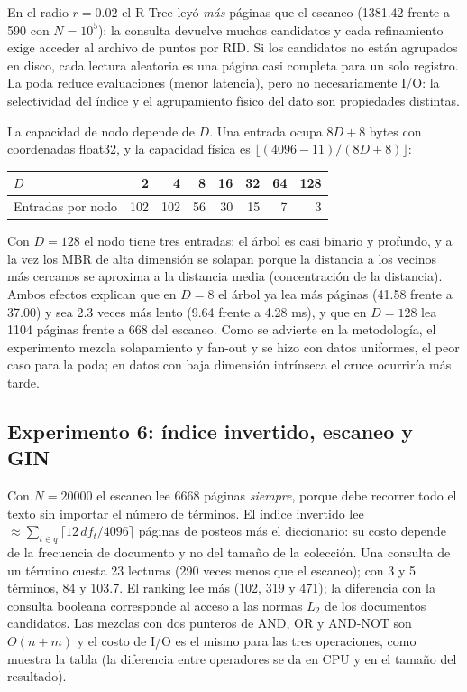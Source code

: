 \documentclass[11pt,a4paper]{article}
\begin{document}
En el radio $r=0.02$ el R-Tree leyó \emph{más} páginas que el escaneo (1381.42 frente a 590 con $N=10^5$): la consulta devuelve muchos candidatos y cada refinamiento exige acceder al archivo de puntos por RID. Si los candidatos no están agrupados en disco, cada lectura aleatoria es una página casi completa para un solo registro. La poda reduce evaluaciones (menor latencia), pero no necesariamente I/O: la selectividad del índice y el agrupamiento físico del dato son propiedades distintas.

La capacidad de nodo depende de $D$. Una entrada ocupa $8D+8$ bytes con coordenadas float32, y la capacidad física es $\lfloor(4096-11)/(8D+8)\rfloor$:
\begin{center}\small\begin{tabular}{@{}lrrrrrrr@{}}\toprule
$D$ & 2 & 4 & 8 & 16 & 32 & 64 & 128\\\midrule
Entradas por nodo & 102 & 102 & 56 & 30 & 15 & 7 & 3\\\bottomrule\end{tabular}\end{center}
Con $D=128$ el nodo tiene tres entradas: el árbol es casi binario y profundo, y a la vez los MBR de alta dimensión se solapan porque la distancia a los vecinos más cercanos se aproxima a la distancia media (concentración de la distancia). Ambos efectos explican que en $D=8$ el árbol ya lea más páginas (41.58 frente a 37.00) y sea 2.3 veces más lento (9.64 frente a 4.28 ms), y que en $D=128$ lea 1104 páginas frente a 668 del escaneo. Como se advierte en la metodología, el experimento mezcla solapamiento y fan-out y se hizo con datos uniformes, el peor caso para la poda; en datos con baja dimensión intrínseca el cruce ocurriría más tarde.

\subsection{Experimento 6: índice invertido, escaneo y GIN}
Con $N=20000$ el escaneo lee 6668 páginas \emph{siempre}, porque debe recorrer todo el texto sin importar el número de términos. El índice invertido lee $\approx\sum_{t\in q}\lceil 12\,df_t/4096\rceil$ páginas de posteos más el diccionario: su costo depende de la frecuencia de documento y no del tamaño de la colección. Una consulta de un término cuesta 23 lecturas (290 veces menos que el escaneo); con 3 y 5 términos, 84 y 103.7. El ranking lee más (102, 319 y 471); la diferencia con la consulta booleana corresponde al acceso a las normas $L_2$ de los documentos candidatos. Las mezclas con dos punteros de AND, OR y AND-NOT son $O(n+m)$ y el costo de I/O es el mismo para las tres operaciones, como muestra la tabla (la diferencia entre operadores se da en CPU y en el tamaño del resultado).
\end{document}
